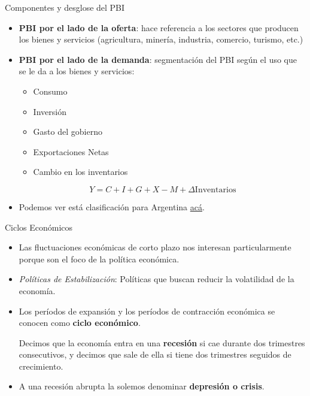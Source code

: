 \documentclass{beamer}
\begin{document}
 
\begin{frame}{Componentes y desglose del PBI}
    \begin{itemize}
    \item \textbf{PBI por el lado de la oferta}: hace referencia a los sectores que producen los bienes y servicios (agricultura, minería, industria, comercio, turismo, etc.) 
    \vspace{2mm}
    \item \textbf{PBI por el lado de la demanda}: segmentación del PBI según el uso que se le da a los bienes y servicios:
    \begin{itemize}
            \item Consumo
            \item Inversión
            \item Gasto del gobierno
            \item Exportaciones Netas
            \item Cambio en los inventarios
        \end{itemize}
        \vspace{2mm}
    \begin{equation*}
        Y = C + I + G + X - M + \Delta \text{Inventarios}
    \end{equation*}
    \item Podemos ver está clasificación para Argentina \href{https://www.indec.gob.ar/uploads/informesdeprensa/pib_03_25F47CEBC54E.pdf}{acá}.
    \end{itemize}

\end{frame}

\begin{frame}{Ciclos Económicos}
    \begin{itemize}
        \item Las fluctuaciones económicas de corto plazo nos interesan particularmente porque son el foco de la política económica.
        \item \textit{Políticas de Estabilización}: Políticas que buscan reducir la volatilidad de la economía.
        \item Los períodos de expansión y los períodos de contracción económica se conocen como \textbf{ciclo económico}.
        \begin{boxB}
        \centering
            Decimos que la economía entra en una \textbf{recesión} si cae durante dos trimestres consecutivos, y
            decimos que sale de ella si tiene dos trimestres seguidos de crecimiento.
        \end{boxB}
        \item A una recesión abrupta la solemos denominar \textbf{depresión o crisis}.
    \end{itemize}
\end{frame}
\end{document}

